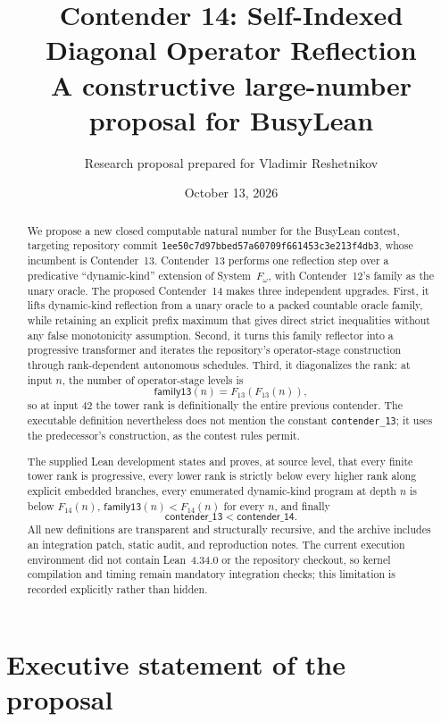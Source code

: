 \documentclass[11pt]{article}
\title{\textbf{Contender 14: Self-Indexed Diagonal Operator Reflection}\\[0.35em]
\large A constructive large-number proposal for BusyLean}
\author{Research proposal prepared for Vladimir Reshetnikov}
\date{October 13, 2026}
\theoremstyle{definition}
\theoremstyle{remark}
\newcommand{\lean}[1]{\texttt{#1}}
\begin{document}
\maketitle

\begin{abstract}
We propose a new closed computable natural number for the BusyLean contest,
targeting repository commit
\texttt{1ee50c7d97bbed57a60709f661453c3e213f4db3}, whose incumbent is
Contender~13.  Contender~13 performs one reflection step over a predicative
``dynamic-kind'' extension of System~$F_\omega$, with Contender~12's family as
the unary oracle.  The proposed Contender~14 makes three independent upgrades.
First, it lifts dynamic-kind reflection from a unary oracle to a packed
countable oracle family, while retaining an explicit prefix maximum that gives
direct strict inequalities without any false monotonicity assumption.  Second,
it turns this family reflector into a progressive transformer and iterates the
repository's operator-stage construction through rank-dependent autonomous
schedules.  Third, it diagonalizes the rank: at input $n$, the number of
operator-stage levels is
\[
  \mathsf{family13}(n)=F_{13}(F_{13}(n)),
\]
so at input $42$ the tower rank is definitionally the entire previous
contender.  The executable definition nevertheless does not mention the
constant \lean{contender\_13}; it uses the predecessor's construction, as the
contest rules permit.

The supplied Lean development states and proves, at source level, that every
finite tower rank is progressive, every lower rank is strictly below every
higher rank along explicit embedded branches, every enumerated dynamic-kind
program at depth $n$ is below $F_{14}(n)$, $\mathsf{family13}(n)<F_{14}(n)$
for every $n$, and finally
\[
  \mathsf{contender\_13}<\mathsf{contender\_14}.
\]
All new definitions are transparent and structurally recursive, and the
archive includes an integration patch, static audit, and reproduction notes.
The current execution environment did not contain Lean~4.34.0 or the repository
checkout, so kernel compilation and timing remain mandatory integration checks;
this limitation is recorded explicitly rather than hidden.
\end{abstract}

\tableofcontents

\section{Executive statement of the proposal}
\end{document}

